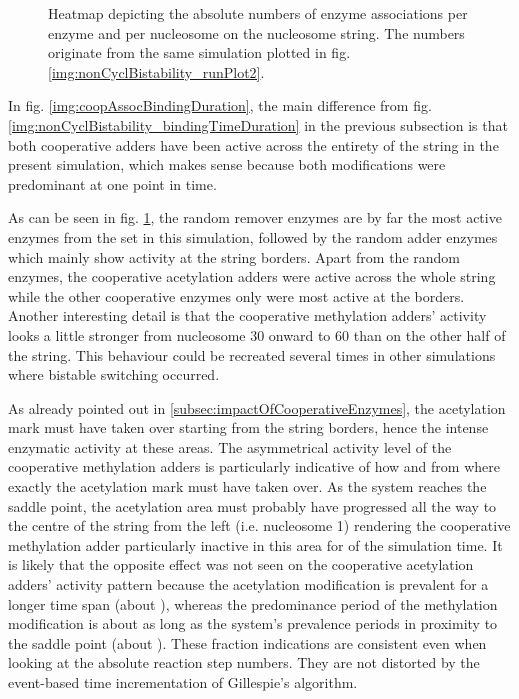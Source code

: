             \begin{figure}[htpb!]
                \centering
                \caption{Heatmap depicting the absolute numbers of enzyme associations per enzyme and per nucleosome on the nucleosome string. The numbers originate from the same simulation plotted in fig. \ref{img:nonCyclBistability_runPlot2}.}
                \label{img:coopAssocBindingNumbers}
            \end{figure}

            In fig. \ref{img:coopAssocBindingDuration}, the main difference from fig. \ref{img:nonCyclBistability_bindingTimeDuration} in the previous subsection is that both cooperative adders have been active across the entirety of the string in the present simulation, which makes sense because both modifications were predominant at one point in time.

            As can be seen in fig. \ref{img:coopAssocBindingNumbers}, the random remover enzymes are by far the most active enzymes from the set in this simulation, followed by the random adder enzymes which mainly show activity at the string borders. Apart from the random enzymes, the cooperative acetylation adders were active across the whole string while the other cooperative enzymes only were most active at the borders. Another interesting detail is that the cooperative methylation adders' activity looks a little stronger from nucleosome 30 onward to 60 than on the other half of the string. This behaviour could be recreated several times in other simulations where bistable switching occurred.

            As already pointed out in \ref{subsec:impactOfCooperativeEnzymes}, the acetylation mark must have taken over starting from the string borders, hence the intense enzymatic activity at these areas. The asymmetrical activity level of the cooperative methylation adders is particularly indicative of how and from where exactly the acetylation mark must have taken over. As the system reaches the saddle point, the acetylation area must probably have progressed all the way to the centre of the string from the left (i.e. nucleosome 1) rendering the cooperative methylation adder particularly inactive in this area for  of the simulation time. It is likely that the opposite effect was not seen on the cooperative acetylation adders' activity pattern because the acetylation modification is prevalent for a longer time span (about ), whereas the predominance period of the methylation modification is about as long as the system's prevalence periods in  proximity to the saddle point (about ). These fraction indications are consistent even when looking at the absolute reaction step numbers. They are not distorted by the event-based time incrementation of Gillespie's algorithm.
